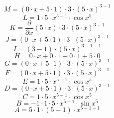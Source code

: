 \documentclass[12pt]{article}
\begin{document}
\begin{equation}
	M = 
\left( 0\cdot x + 5\cdot 1\right) \cdot 3\cdot \left( 5\cdot x\right) ^{3 - 1}
\end{equation}
\begin{equation}
	L = 
1\cdot 5\cdot x^{5 - 1}\cdot \cos {x^{5}}
\end{equation}
\begin{equation}
	K = 
\frac{\partial}{\partial x}\left( 5\cdot x\right) \cdot 3\cdot \left( 5\cdot x\right) ^{3 - 1}
\end{equation}
\begin{equation}
	J = 
\left( 0\cdot x + 5\cdot 1\right) \cdot 3\cdot \left( 5\cdot x\right) ^{3 - 1}
\end{equation}
\begin{equation}
	I = 
\left( 3 - 1\right) \cdot \left( 5\cdot x\right) ^{3 - 1 - 1}
\end{equation}
\begin{equation}
	H = 
0\cdot x + 0\cdot 1 + 0\cdot 1 + 5\cdot 0
\end{equation}
\begin{equation}
	G = 
\left( 0\cdot x + 5\cdot 1\right) \cdot 3\cdot \left( 5\cdot x\right) ^{3 - 1}
\end{equation}
\begin{equation}
	F = 
\left( 0\cdot x + 5\cdot 1\right) \cdot 3\cdot \left( 5\cdot x\right) ^{3 - 1}
\end{equation}
\begin{equation}
	E = 
1\cdot 5\cdot x^{5 - 1}\cdot \cos {x^{5}}
\end{equation}
\begin{equation}
	D = 
\left( 0\cdot x + 5\cdot 1\right) \cdot 3\cdot \left( 5\cdot x\right) ^{3 - 1}
\end{equation}
\begin{equation}
	C = 
1\cdot 5\cdot x^{5 - 1}\cdot \cos {x^{5}}
\end{equation}
\begin{equation}
	B = 
-1\cdot 1\cdot 5\cdot x^{5 - 1}\cdot \sin {x^{5}}
\end{equation}
\begin{equation}
	A = 
5\cdot 1\cdot \left( 5 - 1\right) \cdot x^{5 - 1 - 1}
\end{equation}
\end{document}
